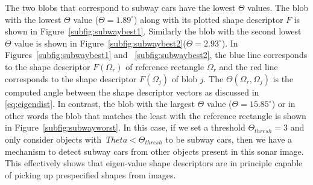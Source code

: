 \documentclass {udthesis}
\begin{document}
The two blobs that correspond to subway cars have the lowest $\Theta$ values. The blob with the lowest $\Theta$ value ($\Theta=1.89^{\circ}$) along with its plotted shape descriptor $F$ is shown in Figure~\ref{subfig:subwaybest1}. Similarly the blob with the second lowest $\Theta$ value is shown in Figure~\ref{subfig:subwaybest2}($\Theta=2.93^{\circ}$). In Figures~\ref{subfig:subwaybest1} and ~\ref{subfig:subwaybest2}, the blue line corresponds to the shape descriptor $F(\Omega_r)$ of reference rectangle $\Omega_r$ and the red line corresponds to the shape descriptor $F(\Omega_j)$ of blob $j$. The $\Theta(\Omega_r,\Omega_j)$ is the computed angle between the shape descriptor vectors as discussed in \eqref{eq:eigendist}. In contrast, the blob with the largest $\Theta$ value ($\Theta=15.85^{\circ}$) or in other words the blob that matches the least with the reference rectangle is shown in Figure~\ref{subfig:subwayworst}. In this case, if we set a threshold $\Theta_{thresh}=3$ and only consider objects with $\
Theta<\Theta_{thresh}$ to 
be subway cars, then we have a mechanism to detect subway cars from other objects present in this sonar image. This effectively shows that eigen-value shape descriptors are in principle capable of picking up prespecified shapes from images.
\end{document}
